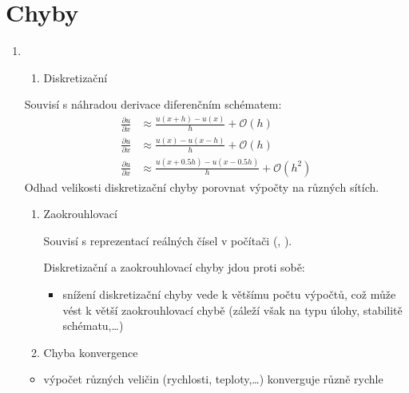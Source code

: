 \documentclass[letterpaper,10pt,czech]{sphinxmanual}
\begin{document}
\section{Chyby}
\label{\detokenize{prednaska_23092022:chyby}}\begin{enumerate}
%
\item {} 
\sphinxAtStartPar
{}
\begin{enumerate}
%
\item {} 
\sphinxAtStartPar
Diskretizační

\end{enumerate}

\sphinxAtStartPar
Souvisí s náhradou derivace diferenčním schématem:
\begin{equation*}
\begin{split}\frac{\partial u}{\partial x} &\approx \frac{u(x+h) - u(x)}{h} + \mathcal{O}(h) \\
\frac{\partial u}{\partial x} &\approx \frac{u(x) - u(x-h)}{h} + \mathcal{O}(h) \\
\frac{\partial u}{\partial x} &\approx \frac{u(x+0.5h) - u(x-0.5h)}{h} + \mathcal{O}(h^2)\end{split}
\end{equation*}
\sphinxAtStartPar
Odhad velikosti diskretizační chyby \textendash{} porovnat výpočty na různých sítích.
\begin{enumerate}
%
\setcounter{enumii}{1}
\item {} 
\sphinxAtStartPar
Zaokrouhlovací

\sphinxAtStartPar
Souvisí s reprezentací reálných čísel v počítači (, ).

\sphinxAtStartPar
Diskretizační a zaokrouhlovací chyby jdou proti sobě:
\begin{itemize}
\item {} 
\sphinxAtStartPar
snížení diskretizační chyby vede k většímu počtu výpočtů, což může vést k větší zaokrouhlovací chybě (záleží však na typu úlohy, stabilitě schématu,…)

\end{itemize}

\item {} 
\sphinxAtStartPar
Chyba konvergence

\end{enumerate}
\begin{itemize}
\item {} 
\sphinxAtStartPar
výpočet různých veličin (rychlosti, teploty,…) konverguje různě rychle


\end{itemize}
\end{enumerate}
\end{document}
